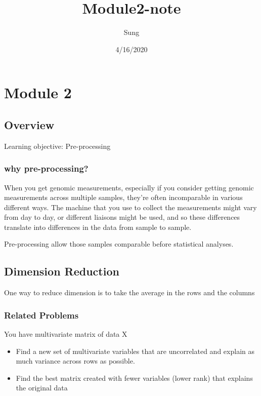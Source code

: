 \documentclass[]{article}
\title{Module2-note}
\author{Sung}
\date{4/16/2020}
\providecommand{\tightlist}{%
  \setlength{\itemsep}{0pt}\setlength{\parskip}{0pt}}
\begin{document}
\maketitle

\section{Module 2}\label{module-2}

\subsection{Overview}\label{overview}

Learning objective: Pre-processing

\subsubsection{why pre-processing?}\label{why-pre-processing}

When you get genomic measurements, especially if you consider getting
genomic measurements across multiple samples, they're often incomparable
in various different ways. The machine that you use to collect the
measurements might vary from day to day, or different liaisons might be
used, and so these differences translate into differences in the data
from sample to sample.

Pre-processing allow those samples comparable before statistical
analyses.

\subsection{Dimension Reduction}\label{dimension-reduction}

One way to reduce dimension is to take the average in the rows and the
columns

\subsubsection{Related Problems}\label{related-problems}

You have multivariate matrix of data X

\begin{itemize}
\tightlist
\item
  Find a new set of multivariate variables that are uncorrelated and
  explain as much variance across rows as possible.
\item
  Find the best matrix created with fewer variables (lower rank) that
  explains the original data
\end{itemize}
\end{document}
